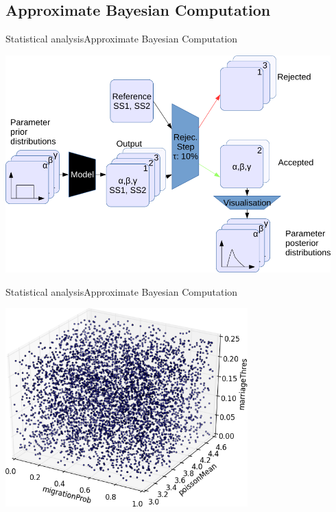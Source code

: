 \documentclass[10pt,aspectratio=43]{beamer}
\begin{document}
\subsection{Approximate Bayesian Computation}
\begin{frame}{Statistical analysis}{Approximate Bayesian Computation}
\begin{center}
  \includegraphics[width=0.94\textwidth]{../data/abc-landscape.png}
\end{center}
\end{frame}

\begin{frame}{Statistical analysis}{Approximate Bayesian Computation}
\begin{center}
  \includegraphics[width=0.7\textwidth]{../data/abc-space.png}
\end{center}
\end{frame}
\end{document}
